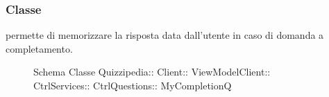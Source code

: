 \subsubsection{Classe }
permette di memorizzare la risposta data dall'utente in caso di domanda a completamento.
\begin{figure}[H]
\centering
\noindent{}
\caption[Schema Classe MyCompletionQ]{Schema Classe Quizzipedia:: Client:: ViewModelClient:: CtrlServices:: CtrlQuestions:: MyCompletionQ}
\end{figure}
